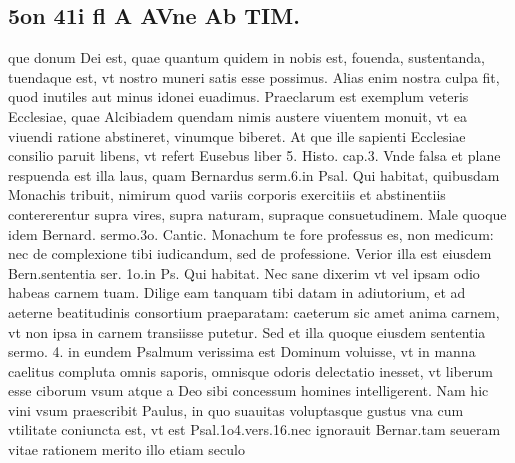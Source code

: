 \documentclass{article}
\begin{document}
\begin{pages}
\section*{5on 41i fl A AVne Ab TIM. }\pstart que donum Dei est, quae quantum quidem in nobis est, fouenda, sustentanda, tuendaque est, vt nostro muneri satis esse possimus. Alias enim nostra culpa fit, quod inutiles aut minus idonei euadimus. Praeclarum est exemplum veteris Ecclesiae, quae Alcibiadem quendam nimis austere viuentem monuit, vt ea viuendi ratione abstineret, vinumque biberet. At que ille sapienti Ecclesiae consilio paruit libens, vt refert Eusebus liber 5. Histo. cap.3. Vnde falsa et plane respuenda est illa laus, quam Bernardus serm.6.in Psal. Qui habitat, quibusdam Monachis tribuit, nimirum quod variis corporis exercitiis et abstinentiis contererentur supra vires, supra naturam, supraque consuetudinem. Male quoque idem Bernard. sermo.3o. Cantic. Monachum te fore professus es, non medicum: nec de complexione tibi iudicandum, sed de professione. Verior illa est eiusdem Bern.sententia ser. 1o.in Ps. Qui habitat. Nec sane dixerim vt vel ipsam odio habeas carnem tuam. Dilige eam tanquam tibi datam in adiutorium, et ad aeterne beatitudinis consortium praeparatam: caeterum sic amet anima carnem, vt non ipsa in carnem transiisse putetur. Sed et illa quoque eiusdem sententia sermo. 4. in eundem Psalmum verissima est Dominum voluisse, vt in manna caelitus compluta omnis saporis, omnisque odoris delectatio inesset, vt liberum esse ciborum vsum atque a Deo sibi concessum homines intelligerent. Nam hic vini vsum praescribit Paulus, in quo suauitas voluptasque gustus vna cum vtilitate coniuncta est, vt est Psal.1o4.vers.16.nec ignorauit Bernar.tam seueram vitae rationem merito illo etiam seculo  \pend

\end{pages}
\end{document}
